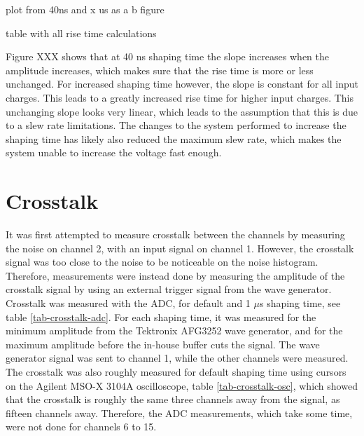 \documentclass[../main/thesis.tex]{subfiles}
\begin{document}
plot from 40ns and x us as a b figure

table with all rise time calculations

Figure XXX shows that at 40 ns shaping time the slope increases when the amplitude increases, which makes sure that the rise time is more or less unchanged. For increased shaping time however, the slope is constant for all input charges. This leads to a greatly increased rise time for higher input charges. This unchanging slope looks very linear, which leads to the assumption that this is due to a slew rate limitations. The changes to the system performed to increase the shaping time has likely also reduced the maximum slew rate, which makes the system unable to increase the voltage fast enough. 


\section{Crosstalk}
\label{ide-crosstalk}

It was first attempted to measure crosstalk between the channels by measuring the noise on channel 2, with an input signal on channel 1. However, the crosstalk signal was too close to the noise to be noticeable on the noise histogram. Therefore, measurements were instead done by measuring the amplitude of the crosstalk signal by using an external trigger signal from the wave generator. Crosstalk was measured with the ADC, for default and 1 $\mu$s shaping time, see table \ref{tab-crosstalk-adc}. For each shaping time, it was measured for the minimum amplitude from the Tektronix AFG3252 wave generator, and for the maximum amplitude before the in-house buffer cuts the signal. The wave generator signal was sent to channel 1, while the other channels were measured. The crosstalk was also roughly measured for default shaping time using cursors on the Agilent MSO-X 3104A oscilloscope, table \ref{tab-crosstalk-osc}, which showed that the crosstalk is roughly the same three channels away from the signal, as fifteen channels away. Therefore, the ADC measurements, which take some time, were not done for channels 6 to 15. 
\end{document}
